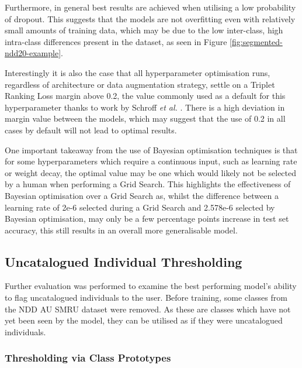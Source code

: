  Furthermore, in general best results are achieved when utilising a low probability of dropout. This suggests that the models are not overfitting even with relatively small amounts of training data, which may be due to the low inter-class, high intra-class differences present in the dataset, as seen in Figure \ref{fig:segmented-ndd20-example}.
 
 Interestingly it is also the case that all hyperparameter optimisation runs, regardless of architecture or data augmentation strategy, settle on a Triplet Ranking Loss margin above 0.2, the value commonly used as a default for this hyperparameter thanks to work by Schroff \textit{et al.} \cite{schroff_facenet_2015}. There is a high deviation in margin value between the models, which may suggest that the use of 0.2 in all cases by default will not lead to optimal results.
 
 One important takeaway from the use of Bayesian optimisation techniques is that for some hyperparameters which require a continuous input, such as learning rate or weight decay, the optimal value may be one which would likely not be selected by a human when performing a Grid Search. This highlights the effectiveness of Bayesian optimisation over a Grid Search as, whilst the difference between a learning rate of 2e-6 selected during a Grid Search and 2.578e-6 selected by Bayesian optimisation, may only be a few percentage points increase in test set accuracy, this still results in an overall more generalisable model. 

\subsection{Uncatalogued Individual Thresholding}\label{ch:ID,sec:ModelSelection,subsec:UncataloguedIndividualThresholding}

Further evaluation was performed to examine the best performing model's ability to flag uncatalogued individuals to the user. Before training, some classes from the NDD AU SMRU dataset were removed. As these are classes which have not yet been seen by the model, they can be utilised as if they were uncatalogued individuals.

\subsubsection{Thresholding via Class Prototypes}\label{ch:ID,sec:ModelSelection,subsec:UncataloguedIndividualThresholding,subsub:prototypes}

